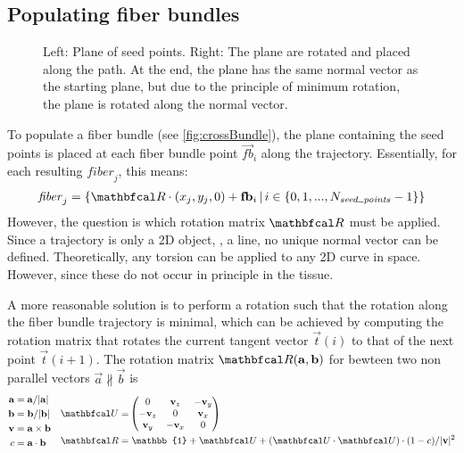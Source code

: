 \subsection{Populating fiber bundles}\label{sec:fillBundle}
%
\begin{figure}[!t]
    \centering
    \setlength{\tikzwidth}{0.75\textwidth}
	\caption{Left: Plane of seed points. Right: The plane are rotated and placed along the path. At the end, the plane has the same normal vector as the starting plane, but due to the principle of minimum rotation, the plane is rotated along the normal vector.}
	\label{fig:torsion}
\end{figure}
%
To populate a fiber bundle (see \cref{fig:crossBundle}), the plane containing the seed points is placed at each fiber bundle point $\vec{fb}_i$ along the trajectory.
Essentially, for each resulting $\mathit{fiber}_j$, this means:
% 
\begin{align}
    \mathit{fiber}_j = \left\{ \mat{R} \cdot (x_j, y_j, 0) + \vec{fb}_i \, | \, i \in \{0,1,...,N_{\mathit{seed\tum{}points}}-1\}\right\}
\end{align}
% 
However,  the question is which rotation matrix $\mat{R}$ must be applied.
Since a trajectory is only a 2D object, \ie{}, a line, no unique normal vector can be defined.
Theoretically, any torsion can be applied to any 2D curve in space.
However, since these do not occur in principle in the tissue.
\par
% 
A more reasonable solution is to perform a rotation such that the rotation along the fiber bundle trajectory is minimal, which can be achieved by computing the rotation matrix that rotates the current tangent vector $\vec{t}(i)$ to that of the next point $\vec{t}(i+1)$.
The rotation matrix $\mat{R}(\vec{a}, \vec{b})$ for bewteen two non parallel vectors $\vec{a} \nparallel \vec{b}$ is
\begin{align}
\begin{split}
    \vec{a} =& \; \vec{a} / |\vec{a}|\\
    \vec{b} =& \; \vec{b} / |\vec{b}|\\
    \vec{v} =& \; \vec{a} \times \vec{b}\\
    c =& \; \vec{a} \cdot \vec{b}
\end{split}
\quad
\begin{split}
    \mat{U} =& \begin{pmatrix} 0 & \vec{v}_z & -\vec{v}_y\\ -\vec{v}_z & 0 & \vec{v}_x\\ \vec{v}_y & -\vec{v}_x & 0\end{pmatrix}\\
    \mat{R} =& \; \mathbb{1} + \mat{U} + (\mat{U} \cdot \mat{U}) \cdot (1 - c) / |\vec{v}|^2
\end{split}
\end{align}
